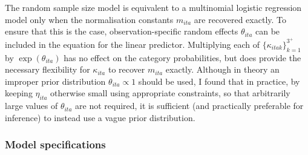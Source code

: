 \documentclass[a4paper, nobind]{templates/ociamthesis}
\begin{document}
The random sample size model is equivalent to a multinomial logistic regression model only when the normalisation constants \(m_{ita}\) are recovered exactly.
To ensure that this is the case, observation-specific random effects \(\theta_{ita}\) can be included in the equation for the linear predictor.
Multiplying each of \(\{\kappa_{itak}\}_{k = 1}^{3^+}\) by \(\exp(\theta_{ita})\) has no effect on the category probabilities, but does provide the necessary flexibility for \(\kappa_{ita}\) to recover \(m_{ita}\) exactly.
Although in theory an improper prior distribution \(\theta_{ita} \propto 1\) should be used, I found that in practice, by keeping \(\eta_{ita}\) otherwise small using appropriate constraints, so that arbitrarily large values of \(\theta_{ita}\) are not required, it is sufficient (and practically preferable for inference) to instead use a vague prior distribution.

\hypertarget{model-specifications}{%
\subsubsection{Model specifications}\label{model-specifications}}
\end{document}
